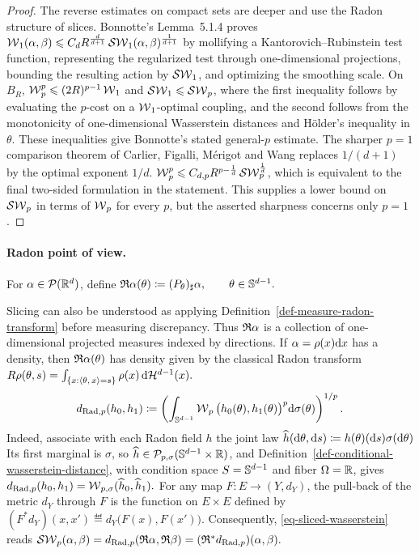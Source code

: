 \begin{proof}
The reverse estimates on compact sets are deeper and use the Radon structure of slices. Bonnotte's Lemma~5.1.4 proves
$\operatorname{\mathcal{W}}_1(\alpha,\beta) \leqslant C_dR^{\frac{d}{d+1}}\operatorname{\mathcal{SW}}_1(\alpha,\beta)^{\frac{1}{d+1}}$
by mollifying a Kantorovich--Rubinstein test function, representing the regularized test through one-dimensional projections, bounding the resulting action by $\operatorname{\mathcal{SW}}_1$, and optimizing the smoothing scale. On $B_R$,
$\operatorname{\mathcal{W}}_p^p\leqslant(2R)^{p-1}\operatorname{\mathcal{W}}_1$ and $\operatorname{\mathcal{SW}}_1\leqslant\operatorname{\mathcal{SW}}_p$,
where the first inequality follows by evaluating the $p$-cost on a $\operatorname{\mathcal{W}}_1$-optimal coupling, and the second follows from the monotonicity of one-dimensional Wasserstein distances and H\"older's inequality in $\theta$. These inequalities give Bonnotte's stated general-$p$ estimate. The sharper $p=1$ comparison theorem of Carlier, Figalli, M\'erigot and Wang replaces $1/(d+1)$ by the optimal exponent $1/d$.
$\operatorname{\mathcal{W}}_p^p \leqslant C_{d,p}R^{p-\frac1d}\operatorname{\mathcal{SW}}_p^{\frac1d}$,
which is equivalent to the final two-sided formulation in the statement. This supplies a lower bound on $\operatorname{\mathcal{SW}}_p$ in terms of $\operatorname{\mathcal{W}}_p$ for every $p$, but the asserted sharpness concerns only $p=1$.
\end{proof}
\paragraph{Radon point of view.}\label{rem-sliced-radon-viewpoint}
\begin{defn}\label{def-measure-radon-transform}
For $\alpha\in\mathcal{P}(\mathbb{R}^d)$, define
\(\mathfrak R\alpha(\theta)\coloneqq(P_\theta)_\sharp\alpha, \qquad \theta\in\mathbb{S}^{d-1}.\)
\end{defn}
Slicing can also be understood as applying Definition~\ref{def-measure-radon-transform} before measuring discrepancy. Thus $\mathfrak R\alpha$ is a collection of one-dimensional projected measures indexed by directions. If $\alpha=\rho(x)\mathrm{d} x$ has a density, then $\mathfrak R\alpha(\theta)$ has density given by the classical Radon transform
\(R\rho(\theta,s) = \int_{\{x:\langle \theta,\,x\rangle=s\}}\rho(x)\,\mathrm{d}\mathcal H^{d-1}(x).\)
\[
d_{\mathrm{Rad},p}(h_0,h_1)
\coloneqq
\left(
\int_{\mathbb{S}^{d-1}}
\operatorname{\mathcal{W}}_p\big(h_0(\theta),h_1(\theta)\big)^p
\mathrm{d}\sigma(\theta)
\right)^{1/p}.
\]
Indeed, associate with each Radon field $h$ the joint law
\(\widehat h(\mathrm{d}\theta,\mathrm{d} s) \coloneqq h(\theta)(\mathrm{d} s)\sigma(\mathrm{d}\theta)\)
Its first marginal is $\sigma$, so $\widehat h\in\mathcal{P}_{p,\sigma}(\mathbb{S}^{d-1}\times\mathbb{R})$, and Definition~\ref{def-conditional-wasserstein-distance}, with condition space $S=\mathbb{S}^{d-1}$ and fiber $\Omega=\mathbb{R}$, gives
\(d_{\mathrm{Rad},p}(h_0,h_1) = \operatorname{\mathcal{W}}_{p,\sigma}(\widehat h_0,\widehat h_1).\)
For any map $F:E\to(Y,d_Y)$, the pull-back of the metric $d_Y$ through $F$ is the function on $E\times E$ defined by \((F^*d_Y)(x,x')\eqdef d_Y\big(F(x),F(x')\big).\)
Consequently, \eqref{eq-sliced-wasserstein} reads \(\operatorname{\mathcal{SW}}_p(\alpha,\beta) = d_{\mathrm{Rad},p}(\mathfrak R\alpha,\mathfrak R\beta) = (\mathfrak R^*d_{\mathrm{Rad},p})(\alpha,\beta).\)
